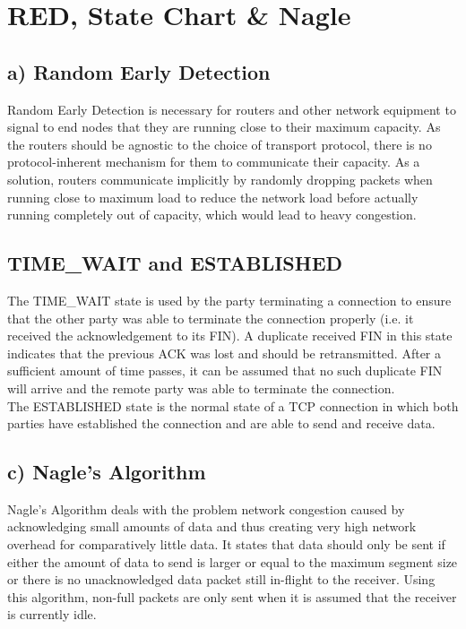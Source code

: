 \documentclass[a4paper, 11 pt, article, accentcolor=tud7b]{tudreport}
\begin{document}
	\section{RED, State Chart \& Nagle}
	
	\subsection*{a) Random Early Detection}
	Random Early Detection is necessary for routers and other network equipment to signal to end nodes that they are running close to their maximum capacity. As the routers should be agnostic to the choice of transport protocol, there is no protocol-inherent mechanism for them to communicate their capacity. As a solution, routers communicate implicitly by randomly dropping packets when running close to maximum load to reduce the network load before actually running completely out of capacity, which would lead to heavy congestion.
	
	\subsection*{TIME\_WAIT and ESTABLISHED}
	The TIME\_WAIT state is used by the party terminating a connection to ensure that the other party was able to terminate the connection properly (i.e. it received the acknowledgement to its FIN). A duplicate received FIN in this state indicates that the previous ACK was lost and should be retransmitted. After a sufficient amount of time passes, it can be assumed that no such duplicate FIN will arrive and the remote party was able to terminate the connection. \\ \medskip
	The ESTABLISHED state is the normal state of a TCP connection in which both parties have established the connection and are able to send and receive data.
	
	\subsection*{c) Nagle's Algorithm}
	Nagle's Algorithm deals with the problem network congestion caused by acknowledging small amounts of data and thus creating very high network overhead for comparatively little data. It states that data should only be sent if either the amount of data to send is larger or equal to the maximum segment size or there is no unacknowledged data packet still in-flight to the receiver. Using this algorithm, non-full packets are only sent when it is assumed that the receiver is currently idle.
	
	
\end{document}
